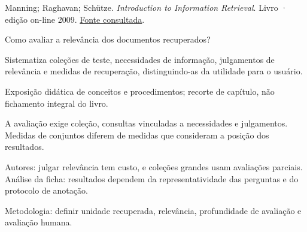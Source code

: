 {\small Manning; Raghavan; Schütze. \textit{Introduction to Information Retrieval}. Livro · edição on-line 2009. \href{https://nlp.stanford.edu/IR-book/pdf/irbookonlinereading.pdf}{Fonte consultada}.\par}

Como avaliar a relevância dos documentos recuperados?

Sistematiza coleções de teste, necessidades de informação, julgamentos de relevância e medidas de recuperação, distinguindo-as da utilidade para o usuário.

Exposição didática de conceitos e procedimentos; recorte de capítulo, não fichamento integral do livro.

A avaliação exige coleção, consultas vinculadas a necessidades e julgamentos. Medidas de conjuntos diferem de medidas que consideram a posição dos resultados.

\begin{itemize}
\end{itemize}

Autores: julgar relevância tem custo, e coleções grandes usam avaliações parciais. Análise da ficha: resultados dependem da representatividade das perguntas e do protocolo de anotação.

Metodologia: definir unidade recuperada, relevância, profundidade de avaliação e avaliação humana.

